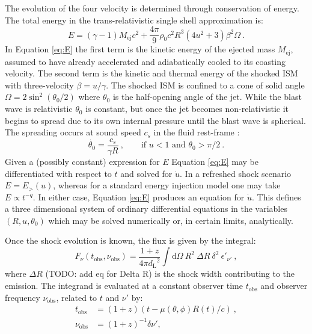 \documentclass[twocolumn]{aastex62}
\newcommand{\dd}{\ensuremath{\mathrm{d}}}
\newcommand{\Mej}{\ensuremath{M_{\mathrm{ej}}}}
\newcommand{\tobs}{\ensuremath{t_{\mathrm{obs}}}}
\newcommand{\nuobs}{\ensuremath{\nu_{\mathrm{obs}}}}
\newcommand{\dL}{\ensuremath{d_{\mathrm{L}}}}
\begin{document}
 The evolution of the four velocity is determined through conservation of energy.  The total energy in the trans-relativistic single shell approximation is:
\begin{equation}
	E = (\gamma - 1)\Mej c^2 + \frac{4\pi}{9} \rho_0 c^2 R^3 (4 u^2 + 3) \beta^2 \Omega\ . \label{eq:E}
\end{equation}
In Equation \eqref{eq:E} the first term is the kinetic energy of the ejected mass $\Mej$, assumed to have already accelerated and adiabatically cooled to its coasting velocity. The second term is the kinetic and thermal energy of the shocked ISM with three-velocity $\beta = u / \gamma$. The shocked ISM is confined to a cone of solid angle $\Omega = 2 \sin^2 (\theta_0/2)$ where $\theta_0$ is the half-opening angle of the jet. While the blast wave is relativistic $\theta_0$ is constant, but once the jet becomes non-relativistic it begins to spread due to its own internal pressure until the blast wave is spherical.  The spreading occurs at sound speed $c_s$ in the fluid rest-frame \citep{van-Eerten:2010aa, Duffell:2018aa}:
\begin{equation}
	\dot{\theta_0} = \frac{c_s}{\gamma R}\ , \qquad \text{if } u < 1\text{ and } \theta_0 > \pi/2\ . \label{eq:thetadot}
\end{equation}
Given a (possibly constant) expression for $E$ Equation \eqref{eq:E} may be differentiated with respect to $t$ and solved for $\dot{u}$.  In a refreshed shock scenario $E = E_{>}(u)$, whereas for a standard energy injection model one may take $E \propto t^{-q}$.  In either case, Equation \eqref{eq:E} produces an equation for $\dot{u}$.  This defines a three dimensional system of ordinary differential equations in the variables $(R, u, \theta_0)$ which may be solved numerically or, in certain limits, analytically.

Once the shock evolution is known, the flux is given by the integral:
\begin{equation}
	F_\nu(\tobs, \nuobs) = \frac{1+z}{4\pi \dL^2} \int \! \dd \Omega\ R^2\ \Delta R\  \delta^2\ \epsilon'_{\nu'} \ , \label{eq:flux2}
\end{equation}
where $\Delta R$ (TODO: add eq for Delta R) is the shock width contributing to the emission. The integrand is evaluated at a constant observer time $\tobs$ and observer frequency $\nuobs$, related to $t$ and $\nu'$ by:
\begin{align}
	\tobs &= (1+z) \left(t - \mu(\theta, \phi) R(t)/c\right)\ , \label{eq:tobs} \\
	\nuobs &= (1+z)^{-1} \delta \nu' , \label{eq:nuobs}
\end{align}
\end{document}
